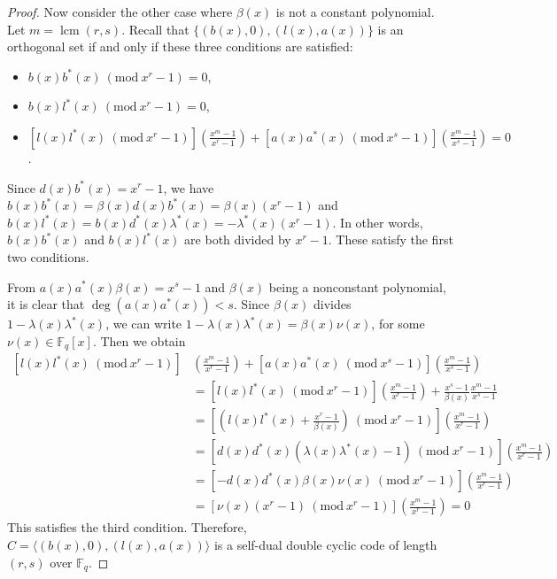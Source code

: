 \documentclass[10pt,a4paper]{amsart}
\newcommand{\Mod}[1]{\ (\mathrm{mod}\ #1)}
\begin{document}
\begin{proof}
		Now consider the other case where $\beta(x)$ is not a constant polynomial. Let $m=\operatorname{lcm}(r,s)$. Recall that $\{(b(x),0),(l(x),a(x))\}$ is an orthogonal set if and only if these three conditions are satisfied:
		\begin{itemize}
			\item $b(x)b^{*}(x)\Mod{x^r-1}=0$,
			\item $b(x)l^{*}(x)\Mod{x^r-1}=0$,
			\item $\left[l(x)l^{*}(x)\Mod{x^r-1}\right] \left(\frac{x^m-1}{x^r-1}\right)+\left[a(x)a^{*}(x)\Mod{x^s-1}\right]\left(\frac{x^m-1}{x^s-1}\right)=0$.
		\end{itemize}
		Since $d(x) b^{*}(x) = x^r-1$, we have $b(x)b^{*}(x)=\beta(x) d(x)b^{*}(x)=\beta(x)(x^r-1)$ and $b(x)l^{*}(x)=b(x) d^{*}(x)\lambda^{*}(x)=-\lambda^{*}(x)(x^r-1)$. In other words, $b(x)b^{*}(x)$ and $b(x)l^{*}(x)$ are both divided by $x^r-1$. These satisfy the first two conditions.
		
		From $a(x)a^{*}(x)\beta(x)=x^s-1$ and $\beta(x)$ being a nonconstant polynomial, it is clear that $\deg(a(x)a^{*}(x))<s$. Since $\beta(x)$ divides $1-\lambda(x)\lambda^{*}(x)$, we can write $1-\lambda(x)\lambda^{*}(x)=\beta(x)\nu(x)$, for some $\nu(x)\in\mathbb{F}_q[x]$. Then we obtain
		\begin{align*}
			\left[l(x)l^{*}(x)\Mod{x^r-1}\right]&\left(\frac{x^m-1}{x^r-1}\right)+\left[a(x)a^{*}(x)\Mod{x^s-1}\right]\left(\frac{x^m-1}{x^s-1}\right)\\
			&=\left[l(x)l^{*}(x)\Mod{x^r-1}\right]\left(\frac{x^m-1}{x^r-1}\right)+\frac{x^s-1}{\beta(x)}\frac{x^m-1}{x^s-1}\\
			&=\left[\left(l(x)l^{*}(x)+\frac{x^r-1}{\beta(x)}\right)\Mod{x^r-1}\right]\left(\frac{x^m-1}{x^r-1}\right)\\
			&=\left[d(x)d^{*}(x)(\lambda(x)\lambda^{*}(x)-1)\Mod{x^r-1}\right]\left(\frac{x^m-1}{x^r-1}\right)\\
			&=\left[-d(x)d^{*}(x)\beta(x)\nu(x)\Mod{x^r-1}\right]\left(\frac{x^m-1}{x^r-1}\right)\\
			&=\left[\nu(x)(x^r-1)\Mod{x^r-1}\right]\left(\frac{x^m-1}{x^r-1}\right)=0
		\end{align*}
		This satisfies the third condition. Therefore, $C=\langle (b(x),0),(l(x),a(x))\rangle$ is a self-dual double cyclic code of length $(r,s)$ over $\mathbb{F}_q$.
	\end{proof}
\end{document}
